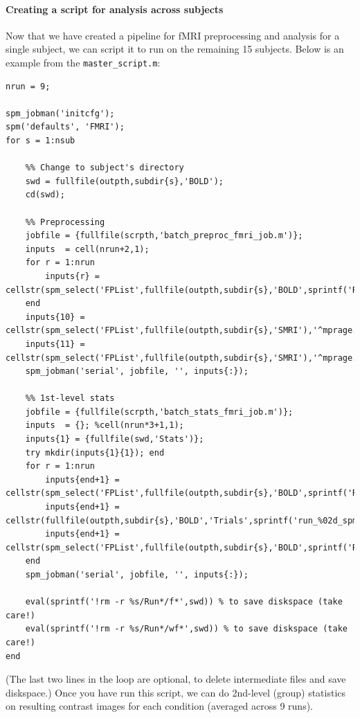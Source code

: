 \paragraph{Creating a script for analysis across subjects}

Now that we have created a pipeline for fMRI preprocessing and analysis for a single subject, we can script it to run on the remaining 15 subjects. Below is an example from the \texttt{master\_script.m}:

\begin{lstlisting}[style=Matlab-editor,basicstyle=\mlttfamily\footnotesize]
nrun = 9;

spm_jobman('initcfg');
spm('defaults', 'FMRI');
for s = 1:nsub
    
    %% Change to subject's directory
    swd = fullfile(outpth,subdir{s},'BOLD');
    cd(swd);
    
    %% Preprocessing
    jobfile = {fullfile(scrpth,'batch_preproc_fmri_job.m')};
    inputs  = cell(nrun+2,1);
    for r = 1:nrun
        inputs{r} = cellstr(spm_select('FPList',fullfile(outpth,subdir{s},'BOLD',sprintf('Run_%02d',r)),'^fMR.*\.nii$'));
    end   
    inputs{10} = cellstr(spm_select('FPList',fullfile(outpth,subdir{s},'SMRI'),'^mprage.*\.nii$'));
    inputs{11} = cellstr(spm_select('FPList',fullfile(outpth,subdir{s},'SMRI'),'^mprage.*\.nii$'));
    spm_jobman('serial', jobfile, '', inputs{:});
    
    %% 1st-level stats
    jobfile = {fullfile(scrpth,'batch_stats_fmri_job.m')};
    inputs  = {}; %cell(nrun*3+1,1);
    inputs{1} = {fullfile(swd,'Stats')}; 
    try mkdir(inputs{1}{1}); end
    for r = 1:nrun
        inputs{end+1} = cellstr(spm_select('FPList',fullfile(outpth,subdir{s},'BOLD',sprintf('Run_%02d',r)),'^swfMR.*\.nii$'));
        inputs{end+1} = cellstr(fullfile(outpth,subdir{s},'BOLD','Trials',sprintf('run_%02d_spmdef.mat',r)));
        inputs{end+1} = cellstr(spm_select('FPList',fullfile(outpth,subdir{s},'BOLD',sprintf('Run_%02d',r)),'^rp.*\.txt$'));
    end   
    spm_jobman('serial', jobfile, '', inputs{:});

    eval(sprintf('!rm -r %s/Run*/f*',swd)) % to save diskspace (take care!)
    eval(sprintf('!rm -r %s/Run*/wf*',swd)) % to save diskspace (take care!)
end
\end{lstlisting}

(The last two lines in the loop are optional, to delete intermediate files and save diskspace.) 
Once you have run this script, we can do 2nd-level (group) statistics on resulting contrast images for each condition (averaged across 9 runs).

